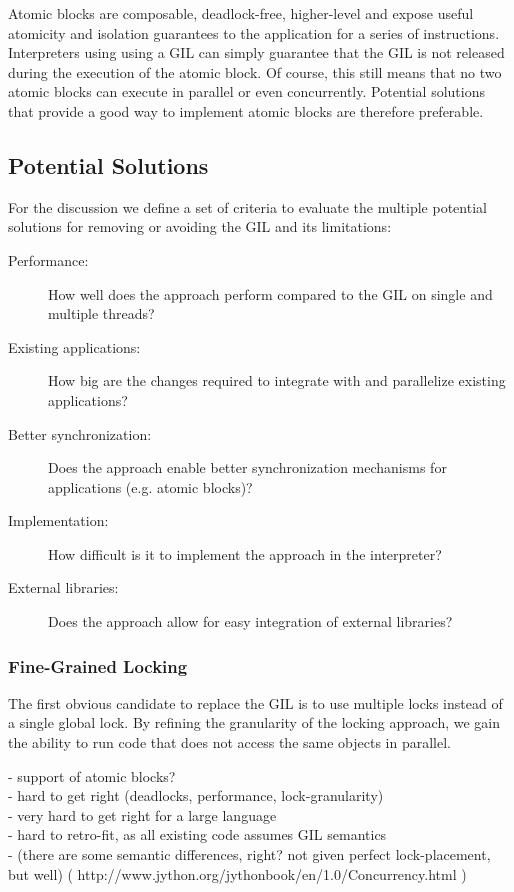 \documentclass{sigplanconf}
\begin{document}
Atomic blocks are composable, deadlock-free, higher-level and expose
useful atomicity and isolation guarantees to the application for a
series of instructions.  Interpreters using using a GIL can simply
guarantee that the GIL is not released during the execution of the
atomic block. Of course, this still means that no two atomic blocks
can execute in parallel or even concurrently. Potential solutions
that provide a good way to implement atomic blocks are therefore
preferable.



\subsection{Potential Solutions}

For the discussion we define a set of criteria to evaluate the
multiple potential solutions for removing or avoiding the GIL and its
limitations:

\begin{description}
\item[Performance:] How well does the approach perform compared to the
  GIL on single and multiple threads?
\item[Existing applications:] How big are the changes required to
  integrate with and parallelize existing applications?
\item[Better synchronization:] Does the approach enable better
  synchronization mechanisms for applications (e.g. atomic blocks)?
\item[Implementation:] How difficult is it to implement the approach
  in the interpreter?
\item[External libraries:] Does the approach allow for easy
  integration of external libraries?
\end{description}


\subsubsection{Fine-Grained Locking}

The first obvious candidate to replace the GIL is to use multiple
locks instead of a single global lock. By refining the granularity
of the locking approach, we gain the ability to run code that does
not access the same objects in parallel.


- support of atomic blocks?\\
- hard to get right (deadlocks, performance, lock-granularity)\\
- very hard to get right for a large language\\
- hard to retro-fit, as all existing code assumes GIL semantics\\
- (there are some semantic differences, right? not given perfect lock-placement, but well)
( http://www.jython.org/jythonbook/en/1.0/Concurrency.html )
\end{document}
